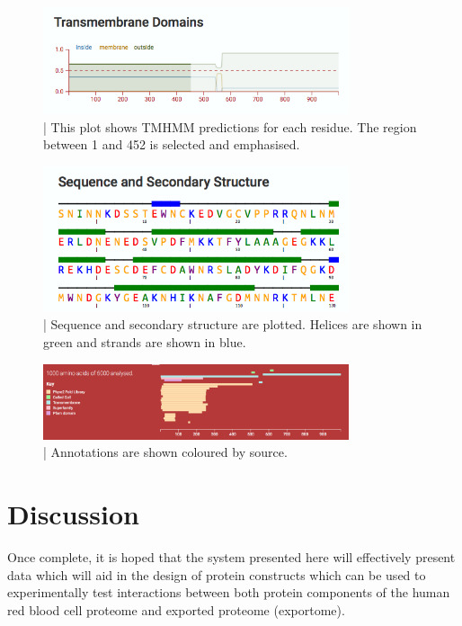\documentclass[fleqn,10pt]{article} %
\begin{document}
\begin{figure}
\includegraphics[width=9cm]{figs/seriesgroupplot}
\caption{ | This plot shows TMHMM predictions for each residue. The region between 1 and 452 is selected and emphasised.}
\end{figure}

\begin{figure}
\includegraphics[width=9cm]{figs/secondarystructureplot}
\caption{ | Sequence and secondary structure are plotted. Helices are shown in green and strands are shown in blue.}
\end{figure}

\begin{figure}
\includegraphics[width=9cm]{figs/annotationplot}
\caption{ | Annotations are shown coloured by source.}
\end{figure}

\section{Discussion}

Once complete, it is hoped that the system presented here will effectively present data which will aid in the design of protein constructs which can be used to experimentally test interactions between both protein components of the human red blood cell proteome and exported \pf proteome (exportome). 
\end{document}
